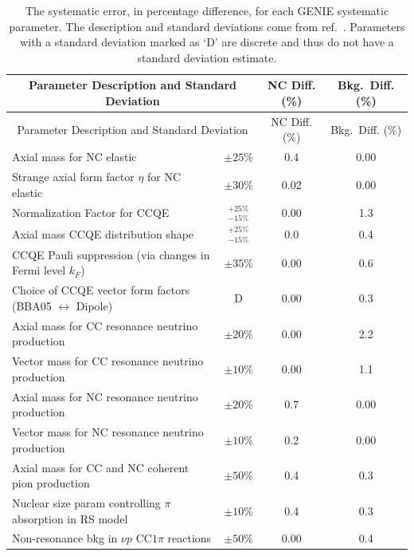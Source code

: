 \singlespacing
\begin{longtable}{p{3.5in} c c c}
  \caption[GENIE Systematic Errors]{The systematic error, in percentage difference, for each GENIE systematic parameter. The description and standard deviations come from ref.~\cite{ref:GENIE, ref:TNGENIE}. Parameters with a standard deviation marked as `D' are discrete and thus do not have a standard deviation estimate.} \tabularnewline
  \hline\hline
  \multicolumn{2}{c}{Parameter Description and Standard Deviation} & NC Diff. (\%) & Bkg.~Diff. (\%) \\
  \hline \endfirsthead
  \hline\hline
  \multicolumn{2}{c}{Parameter Description and Standard Deviation} & NC Diff. (\%) & Bkg.~Diff. (\%) \\
  \hline \endhead
  Axial mass for NC elastic & $\pm25\%$ & 0.4 & 0.00 \\
  Strange axial form factor $\eta$ for NC elastic & $\pm30\%$ & 0.02 & 0.00 \\
  Normalization Factor for CCQE & $^{+25\%}_{-15\%}$ & 0.00 & 1.3 \\
  Axial mass CCQE distribution shape & $^{+25\%}_{-15\%}$ & 0.0 & 0.4 \\
  CCQE Pauli suppression (via changes in Fermi level $k_F$) & $\pm35\%$ & 0.00 & 0.6 \\
  Choice of CCQE vector form factors \newline (BBA05 $\leftrightarrow$ Dipole) & D & 0.00 & 0.3 \\
  Axial mass for CC resonance neutrino production & $\pm20\%$ & 0.00 & 2.2 \\
  Vector mass for CC resonance neutrino \newline production & $\pm10\%$ & 0.00 & 1.1 \\
  Axial mass for NC resonance neutrino production & $\pm20\%$ & 0.7 & 0.00 \\
  Vector mass for NC resonance neutrino production & $\pm10\%$ & 0.2 & 0.00 \\
  Axial mass for CC and NC coherent pion \newline production & $\pm50\%$ & 0.4 & 0.3 \\
  Nuclear size param controlling $\pi$ absorption in RS model & $\pm10\%$ & 0.4 & 0.3 \\
  Non-resonance bkg in $\nu p$ CC$1\pi$ reactions & $\pm50\%$ & 0.00 & 0.4 \\

\end{longtable}
